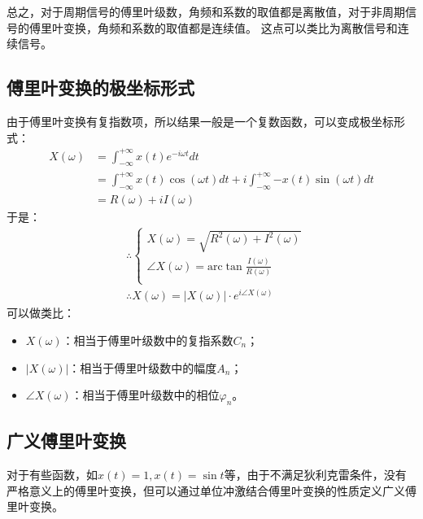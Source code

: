 总之，对于周期信号的傅里叶级数，角频和系数的取值都是离散值，对于非周期信号的傅里叶变换，角频和系数的取值都是连续值。
这点可以类比为离散信号和连续信号。

\subsection{傅里叶变换的极坐标形式}

由于傅里叶变换有复指数项，所以结果一般是一个复数函数，可以变成极坐标形式：
\begin{align*}
X\left( \omega \right) &=\int_{-\infty}^{+\infty}{x\left( t \right) e^{-i\omega t}dt} \\
&=\int_{-\infty}^{+\infty}{x\left( t \right) \cos \left( \omega t \right) dt}+i\int_{-\infty}^{+\infty}{-x\left( t \right) \sin \left( \omega t \right) dt} \\
&=R\left( \omega \right) +iI\left( \omega \right)
\end{align*}
于是：
\begin{align*}
&\therefore \begin{cases}
	X\left( \omega \right) =\sqrt{R^2\left( \omega \right) +I^2\left( \omega \right)}\\
	\angle X\left( \omega \right) =\mathrm{arc}\tan \frac{I\left( \omega \right)}{R\left( \omega \right)}\\
\end{cases} \\
&\therefore X\left( \omega \right) =\left| X\left( \omega \right) \right|\cdot e^{i\angle X\left( \omega \right)}
\end{align*}
可以做类比：
\begin{itemize}
    \item $X\left( \omega \right) $：相当于傅里叶级数中的复指系数$C_n$；
    \item $\left| X\left( \omega \right) \right|$：相当于傅里叶级数中的幅度$A_n$；
    \item $\angle X\left( \omega \right) $：相当于傅里叶级数中的相位$\varphi _n$。
\end{itemize}

\subsection{广义傅里叶变换}

对于有些函数，如$x\left( t \right) =1,x\left( t \right) =\sin t$等，由于不满足狄利克雷条件，没有严格意义上的傅里叶变换，但可以通过单位冲激结合傅里叶变换的性质定义广义傅里叶变换。

